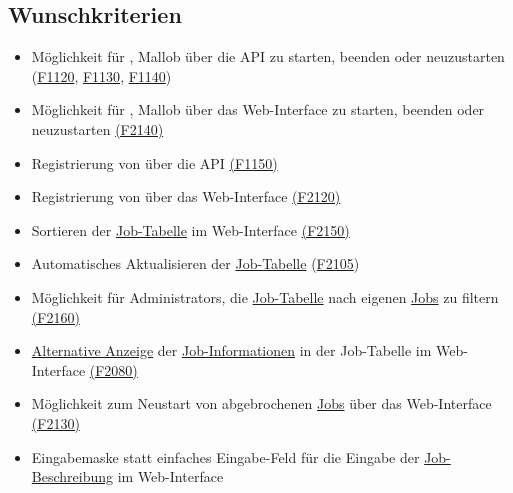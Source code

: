         
\subsection{Wunschkriterien}
    \begin{itemize}[noitemsep]
        \item Möglichkeit für , \gls{Mallob} über die \gls{API} zu starten, beenden oder neuzustarten  (\hyperref[FA:API:Starten von Mallob]{F1120}, \hyperref[FA:API:Stoppen von Mallob]{F1130}, \hyperref[FA:API:Neustart von Mallob]{F1140})
        \item Möglichkeit für , \gls{Mallob} über das \gls{Web-Interface} zu starten, beenden oder neuzustarten  \hyperref[FA:Web-Interface:Verwalten von Malllob]{(F2140)}
        \item Registrierung von  über die \gls{API} \hyperref[FA:API:Registrierung von Nutzern]{(F1150)}
        \item Registrierung von  über das \gls{Web-Interface} \hyperref[FA:Web-Interface:Registrierung von Nutzern]{(F2120)}
        \item Sortieren der \hyperref[pages:job-table]{Job-Tabelle} im \gls{Web-Interface} \hyperref[FA:Web-Interface:Sortieren der Tabelle]{(F2150)}
        \item Automatisches Aktualisieren der \hyperref[pages:job-table]{Job-Tabelle} (\hyperref[FA:Web-Interface:Aktualisieren]{F2105})
        \item Möglichkeit für \glspl{Administrator}, die \hyperref[pages:job-table]{Job-Tabelle} nach eigenen \hyperref[B:Jobs]{Jobs} zu filtern \hyperref[FA:Web-Interface:Filtern für Admins]{(F2160)}
        \item \hyperref[pages:job-table-alt]{Alternative Anzeige} der \hyperref[B:Job-Informationen]{Job-Informationen} in der Job-Tabelle im \gls{Web-Interface} \hyperref[FA:Web-Interface:Einsehen von Job-Informationen]{(F2080)}
        \item Möglichkeit zum Neustart von abgebrochenen \hyperref[B:Jobs]{Jobs} über das \gls{Web-Interface} \hyperref[FA:Web-Interface:Neustart]{(F2130)}
        \item Eingabemaske statt einfaches Eingabe-Feld für die Eingabe der \hyperref[B:Job-Beschreibung]{Job-Beschreibung} im \gls{Web-Interface}

\end{itemize}
